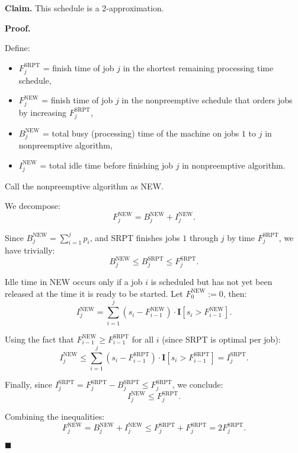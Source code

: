 \textbf{Claim.}
 This schedule is a 2-approximation.

\vspace{0.5em}
\textbf{Proof.}

Define:
\begin{itemize}
    \item $F_j^{\text{SRPT}}$ = finish time of job $j$ in the shortest remaining processing time schedule,
    \item $F_j^{\text{NEW}}$ = finish time of job $j$ in the nonpreemptive schedule that orders jobs by increasing $F_j^{\text{SRPT}}$,
    \item $B_j^{\text{NEW}}$ = total busy (processing) time of the machine on jobs $1$ to $j$ in nonpreemptive algorithm,
    \item $I_j^{\text{NEW}}$ = total idle time before finishing job $j$ in nonpreemptive algorithm.
\end{itemize}

Call the nonpreemptive algorithm as NEW.

We decompose:
\[
F_j^{\text{NEW}} = B_j^{\text{NEW}} + I_j^{\text{NEW}}.
\]

Since $B_j^{\text{NEW}} = \sum_{i=1}^j p_i$, and SRPT finishes jobs $1$ through $j$ by time $F_j^{\text{SRPT}}$, we have trivially:
\[
B_j^{\text{NEW}} \le B_j^{\text{SRPT}} \le F_j^{\text{SRPT}}.
\]

Idle time in NEW occurs only if a job $i$ is scheduled but has not yet been released at the time it is ready to be started. Let $F_0^{\text{NEW}} := 0$, then:
\[
I_j^{\text{NEW}} = \sum_{i=1}^{j} (s_i - F_{i-1}^{\text{NEW}}) \cdot \mathbf{I}[s_i > F_{i-1}^{\text{NEW}}].
\]

Using the fact that $F_{i-1}^{\text{NEW}} \ge F_{i-1}^{\text{SRPT}}$ for all $i$ (since SRPT is optimal per job):
\[
I_j^{\text{NEW}} \le \sum_{i=1}^{j} (s_i - F_{i-1}^{\text{SRPT}}) \cdot \mathbf{I}[s_i > F_{i-1}^{\text{SRPT}}] = I_j^{\text{SRPT}}.
\]

Finally, since $I_j^{\text{SRPT}} = F_j^{\text{SRPT}} - B_j^{\text{SRPT}} \le F_j^{\text{SRPT}}$, we conclude:
\[
I_j^{\text{NEW}} \le F_j^{\text{SRPT}}.
\]

Combining the inequalities:
\[
F_j^{\text{NEW}} = B_j^{\text{NEW}} + I_j^{\text{NEW}} \le F_j^{\text{SRPT}} + F_j^{\text{SRPT}} = 2 F_j^{\text{SRPT}}.
\]

\hfill$\blacksquare$

    
